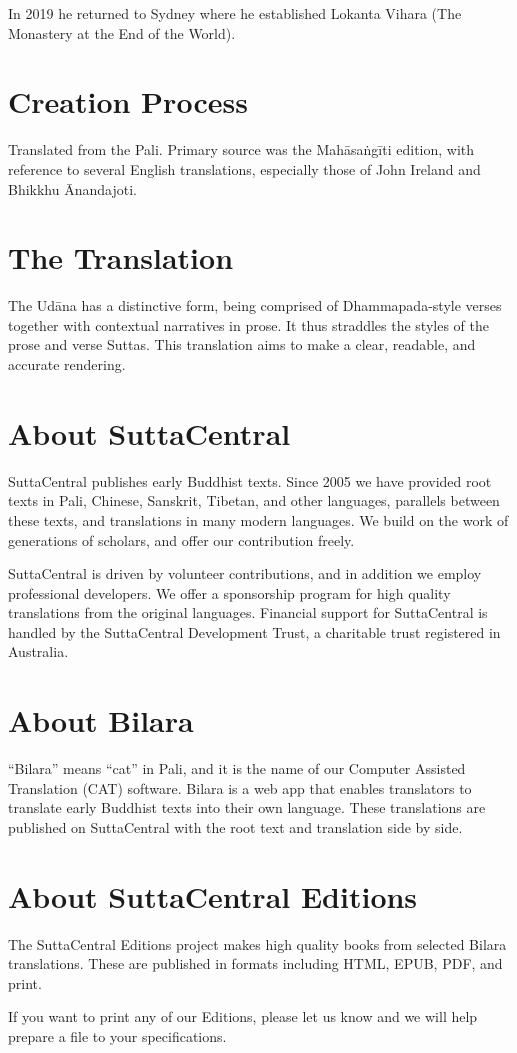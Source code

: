 \documentclass[12pt,openany]{book}%
\begin{document}
In 2019 he returned to Sydney where he established Lokanta Vihara (The Monastery at the End of the World). 

\section*{Creation Process}

Translated from the Pali. Primary source was the \textsanskrit{Mahāsaṅgīti} edition, with reference to several English translations, especially those of John Ireland and Bhikkhu Ānandajoti.

\section*{The Translation}

The \textsanskrit{Udāna} has a distinctive form, being comprised of Dhammapada-style verses together with contextual narratives in prose. It thus straddles the styles of the prose and verse Suttas. This translation aims to make a clear, readable, and accurate rendering.

\section*{About SuttaCentral}

SuttaCentral publishes early Buddhist texts. Since 2005 we have provided root texts in Pali, Chinese, Sanskrit, Tibetan, and other languages, parallels between these texts, and translations in many modern languages. We build on the work of generations of scholars, and offer our contribution freely.

SuttaCentral is driven by volunteer contributions, and in addition we employ professional developers. We offer a sponsorship program for high quality translations from the original languages. Financial support for SuttaCentral is handled by the SuttaCentral Development Trust, a charitable trust registered in Australia.

\section*{About Bilara}

“Bilara” means “cat” in Pali, and it is the name of our Computer Assisted Translation (CAT) software. Bilara is a web app that enables translators to translate early Buddhist texts into their own language. These translations are published on SuttaCentral with the root text and translation side by side.

\section*{About SuttaCentral Editions}

The SuttaCentral Editions project makes high quality books from selected Bilara translations. These are published in formats including HTML, EPUB, PDF, and print.

If you want to print any of our Editions, please let us know and we will help prepare a file to your specifications.

%
\end{document}

